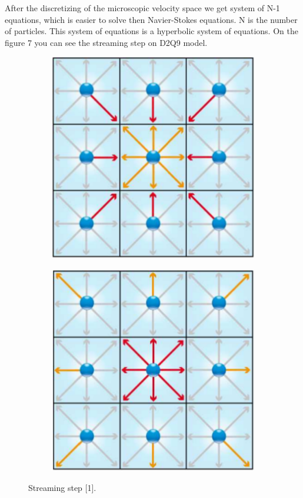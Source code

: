 After the discretizing of the microscopic velocity space we get system of N-1 equations, which is easier to solve then Navier-Stokes equations. N is the number of particles. This system of equations is a hyperbolic system of equations. On the figure 7 you can see the streaming step on D2Q9 model.

\begin{figure}[H]
  \centering
  \begin{subfigure}[h]{0.4\textwidth}
    \includegraphics[width=\textwidth]{img/fig7-1.png}
  \end{subfigure}
  \begin{subfigure}[h]{0.4\textwidth}
    \includegraphics[width=\textwidth]{img/fig7-2.png}
  \end{subfigure}
  \caption{Streaming step [1].}
\end{figure}
